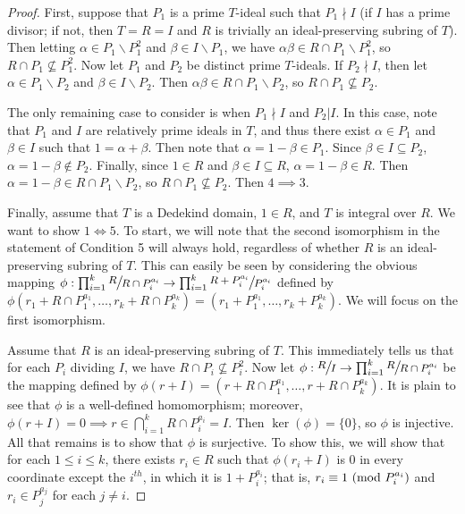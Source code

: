 \documentclass[12pt]{amsart}
\theoremstyle{definition}
\newcommand{\modulo}[1]{\textup{ (mod }#1)}
\newcommand{\quot}[2]{\large\sfrac{#1}{#2}\normalsize}
\begin{document}
\begin{proof}
		First, suppose that $P_1$ is a prime $T$-ideal such that $P_1\nmid I$ (if $I$ has a prime divisor; if not, then $T=R=I$ and $R$ is trivially an ideal-preserving subring of $T$). Then letting $\alpha\in P_1\backslash P_1^2$ and $\beta\in I\backslash P_1$, we have $\alpha\beta\in R\cap P_1\backslash P_1^2$, so $R\cap P_1\nsubseteq P_1^2$. Now let $P_1$ and $P_2$ be distinct prime $T$-ideals. If $P_2\nmid I$, then let $\alpha\in P_1\backslash P_2$ and $\beta\in I\backslash P_2$. Then $\alpha\beta\in R\cap P_1\backslash P_2$, so $R\cap P_1\nsubseteq P_2$. 
		
		The only remaining case to consider is when $P_1\nmid I$ and $P_2|I$. In this case, note that $P_1$ and $I$ are relatively prime ideals in $T$, and thus there exist $\alpha\in P_1$ and $\beta\in I$ such that $1=\alpha+\beta$. Then note that $\alpha=1-\beta\in P_1$. Since $\beta\in I\subseteq P_2$, $\alpha=1-\beta\notin P_2$. Finally, since $1\in R$ and $\beta\in I\subseteq R$, $\alpha=1-\beta\in R$. Then $\alpha=1-\beta\in R\cap P_1\backslash P_2$, so $R\cap P_1\nsubseteq P_2$. Then $4\implies 3$.
		
		Finally, assume that $T$ is a Dedekind domain, $1\in R$, and $T$ is integral over $R$. We want to show $1\iff 5$. To start, we will note that the second isomorphism in the statement of Condition 5 will always hold, regardless of whether $R$ is an ideal-preserving subring of $T$. This can easily be seen by considering the obvious mapping $\phi:\prod_{i=1}^k\quot{R}{R\cap P_i^{a_i}}\to \prod_{i=1}^k\quot{R+P_i^{a_i}}{P_i^{a_i}}$ defined by $\phi(r_1+R\cap P_1^{a_1},\dots,r_k+R\cap P_k^{a_k})=(r_1+P_1^{a_1},\dots,r_k+P_k^{a_k})$. We will focus on the first isomorphism.
		
		Assume that $R$ is an ideal-preserving subring of $T$. This immediately tells us that for each $P_i$ dividing $I$, we have $R\cap P_i\nsubseteq P_i^2$. Now let $\phi:\quot{R}{I}\to \prod_{i=1}^k\quot{R}{R\cap P_i^{a_i}}$ be the mapping defined by $\phi(r+I)=(r+R\cap P_1^{a_1},\dots,r+R\cap P_k^{a_k})$. It is plain to see that $\phi$ is a well-defined homomorphism; moreover, $\phi(r+I)=0\implies r\in \bigcap_{i=1}^k R\cap P_i^{a_i}=I$. Then $\ker(\phi)=\{0\}$, so $\phi$ is injective. All that remains is to show that $\phi$ is surjective. To show this, we will show that for each $1\leq i\leq k$, there exists $r_i\in R$ such that $\phi(r_i+I)$ is 0 in every coordinate except the $i^{th}$, in which it is $1+P_i^{a_i}$; that is, $r_i\equiv 1\modulo{P_i^{a_i}}$ and $r_i\in P_j^{a_j}$ for each $j\neq i$.
		

\end{proof}
\end{document}
